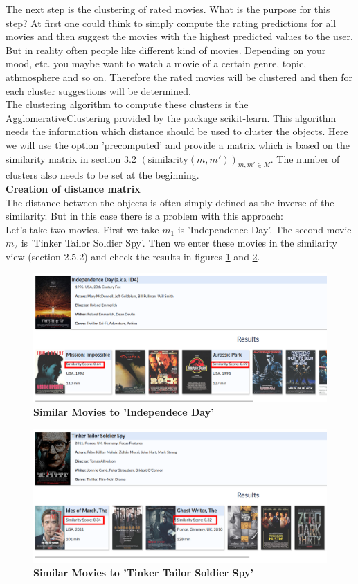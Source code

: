 \documentclass{article}
\begin{document}
The next step is the clustering of rated movies. What is the purpose for this step? At first one could think to simply compute the rating predictions for all movies and then suggest the movies with the highest predicted values to the user. But in reality often people like different kind of movies. Depending on your mood, etc. you maybe want to watch a movie of a certain genre, topic, athmosphere and so on. Therefore the rated movies will be clustered and then for each cluster suggestions will be determined.\\
The clustering algorithm to compute these clusters is the AgglomerativeClustering provided by the package scikit-learn. This algorithm needs the information which distance should be used to cluster the objects. Here we will use the option 'precomputed' and provide a matrix which is based on the similarity matrix in section 3.2 $(\text{similarity}(m,m'))_{m,m'\in M}$. The number of clusters also needs to be set at the beginning.\\[2ex]
\textbf{Creation of distance matrix}\\[2ex]
The distance between the objects is often simply defined as the inverse of the similarity. But in this case there is a problem with this approach:\\
Let's take two movies. First we take $m_1$ is 'Independence Day'. The second movie $m_2$ is 'Tinker Tailor Soldier Spy'. Then we enter these movies in the similarity view (section 2.5.2) and check the results in figures \ref{fig_sec3_similarity_1} and \ref{fig_sec3_similarity_2}.
\begin{figure}[t!]
\includegraphics[scale=0.38]{screenshots_app/sec3_similarity_1.png}
\caption{\textbf{Similar Movies to 'Independece Day'}}\label{fig_sec3_similarity_1}
\end{figure}
\begin{figure}[t!]
\includegraphics[scale=0.38]{screenshots_app/sec3_similarity_2.png}
\caption{\textbf{Similar Movies to 'Tinker Tailor Soldier Spy'}}\label{fig_sec3_similarity_2}
\end{figure}
\end{document}
